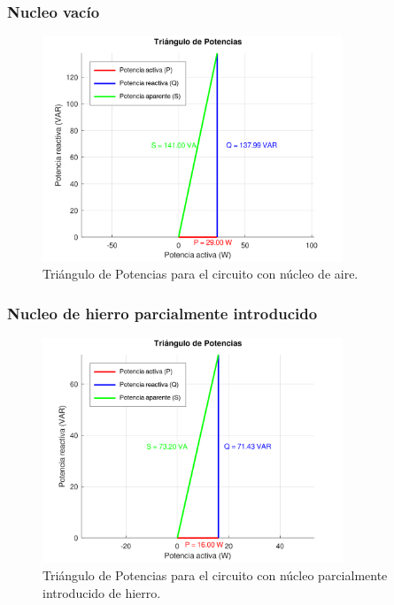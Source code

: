 \documentclass{article}
\begin{document}
        \subsubsection{Nucleo vacío}
            \begin{figure}[H]
                \centering
                \includegraphics[width=0.8\textwidth]{graficoAire.png}
                \caption{Triángulo de Potencias para el circuito con núcleo de aire.}
                \label{fig:graficoAire}
            \end{figure}
        
        \subsubsection{Nucleo de hierro parcialmente introducido}
            \begin{figure}[H]
                \centering
                \includegraphics[width=0.8\textwidth]{graficoParcialHierro.png}
                \caption{Triángulo de Potencias para el circuito con núcleo parcialmente introducido de hierro.}
                \label{fig:graficoParcialHierro}
            \end{figure}
\end{document}
